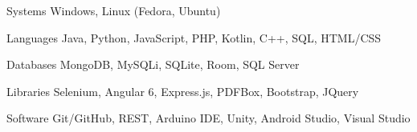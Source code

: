 

\begin{cvskills}

  \cvskill
    {Systems} %
    {Windows, Linux (Fedora, Ubuntu)} %

  \cvskill
    {Languages} %
    {Java, Python, JavaScript, PHP, Kotlin, C++, SQL, HTML/CSS} %

  \cvskill
    {Databases} %
    {MongoDB, MySQLi, SQLite, Room, SQL Server} %

  \cvskill
    {Libraries} %
    {Selenium, Angular 6, Express.js, PDFBox, Bootstrap, JQuery} %

  \cvskill
    {Software} %
    {Git/GitHub, REST, Arduino IDE, Unity, Android Studio, Visual Studio} %

\end{cvskills}
